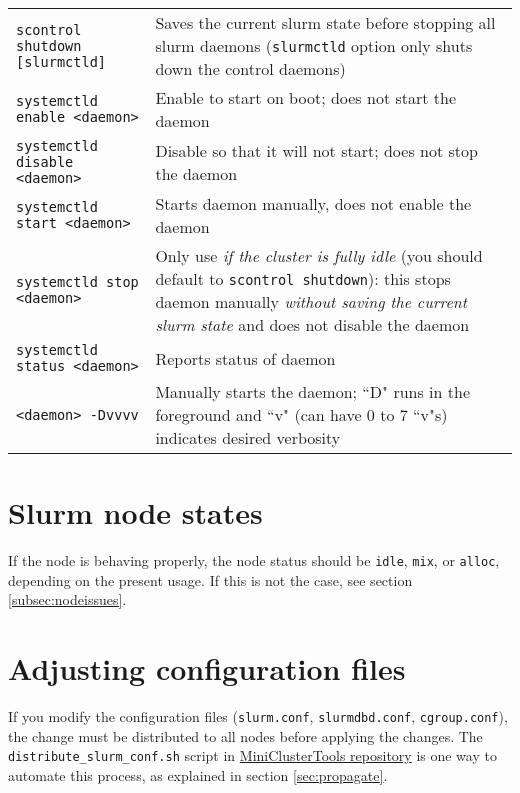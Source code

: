 \begin{itemize}
    \begin{tabular}{l p{3.8in}}
      \texttt{scontrol shutdown [slurmctld]} & Saves the current slurm state before stopping all slurm daemons (\texttt{slurmctld} option only shuts down the control daemons) \\
      \texttt{systemctld enable <daemon>}  & Enable to start on boot; does not start the daemon \\
      \texttt{systemctld disable <daemon>} & Disable so that it will not start; does not stop the daemon \\
      \texttt{systemctld start <daemon>}   & Starts daemon manually, does not enable the daemon \\
      \texttt{systemctld stop <daemon>}    & Only use \emph{if the cluster is fully idle} (you should default to \texttt{scontrol shutdown}): this stops daemon manually \emph{without saving the current slurm state} and does not disable the daemon \\
      \texttt{systemctld status <daemon>}  & Reports status of daemon \\
      \texttt{<daemon> -Dvvvv}             & Manually starts the daemon; ``D" runs in the foreground and ``v" (can have 0 to 7 ``v"s) indicates desired verbosity \\
    \end{tabular}
\end{itemize}

\section{Slurm node states} \label{sec:slurmnodestate}

If the node is behaving properly, the node status should be \texttt{idle}, \texttt{mix}, or \texttt{alloc}, depending on the present usage. If this is not the case, see section \ref{subsec:nodeissues}.

\section{Adjusting configuration files} \label{sec:slurmconfig}

If you modify the configuration files (\texttt{slurm.conf}, \texttt{slurmdbd.conf}, \texttt{cgroup.conf}), the change must be distributed to all nodes before applying the changes. The \texttt{distribute\_slurm\_conf.sh} script in \href{https://github.com/coyleej/MiniClusterTools}{MiniClusterTools repository} is one way to automate this process, as explained in section \ref{sec:propagate}.

